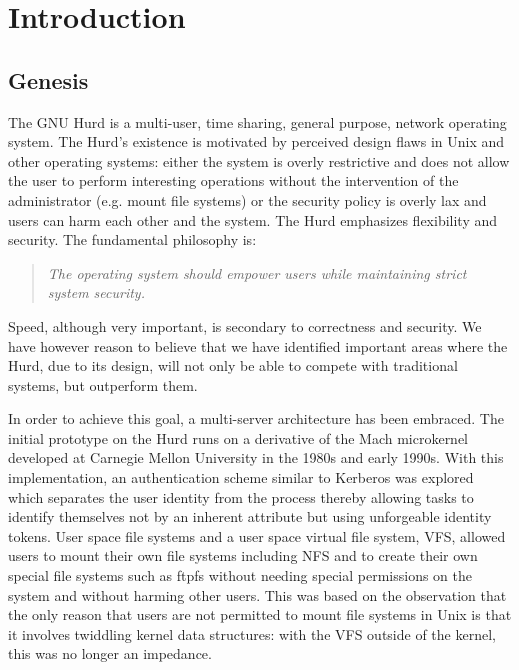 \chapter{Introduction}

\section{Genesis}

The GNU Hurd is a multi-user, time sharing, general purpose, network
operating system.  The Hurd's existence is motivated by perceived
design flaws in Unix and other operating systems: either the system is
overly restrictive and does not allow the user to perform interesting
operations without the intervention of the administrator (e.g. mount
file systems) or the security policy is overly lax and users can harm
each other and the system.  The Hurd emphasizes flexibility and
security.  The fundamental philosophy is:

\begin{quote}
  \emph{The operating system should empower users while maintaining
  strict system security.}
\end{quote}

\noindent
Speed, although very important, is secondary to correctness and
security.  We have however reason to believe that we have identified
important areas where the Hurd, due to its design, will not only be
able to compete with traditional systems, but outperform them.

In order to achieve this goal, a multi-server architecture has been
embraced.  The initial prototype on the Hurd runs on a derivative of
the Mach microkernel developed at Carnegie Mellon University in the
1980s and early 1990s.  With this implementation, an authentication
scheme similar to Kerberos was explored which separates the user
identity from the process thereby allowing tasks to identify
themselves not by an inherent attribute but using unforgeable identity
tokens.  User space file systems and a user space virtual file system,
VFS, allowed users to mount their own file systems including NFS and
to create their own special file systems such as ftpfs without needing
special permissions on the system and without harming other users.
This was based on the observation that the only reason that users are
not permitted to mount file systems in Unix is that it involves
twiddling kernel data structures: with the VFS outside of the kernel,
this was no longer an impedance.

